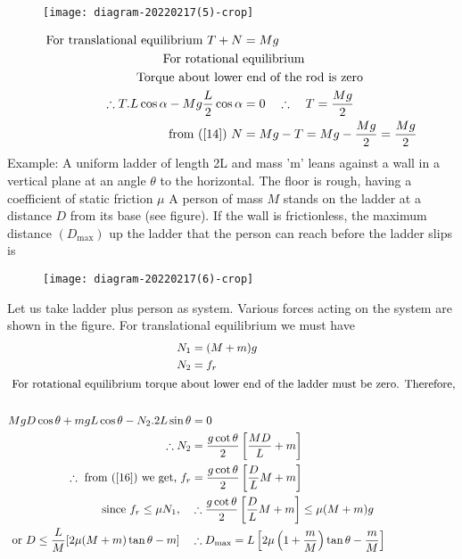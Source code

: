 \begin{enumerate}
\begin{figure}[H]
	\centering
	\texttt{[image: diagram-20220217(5)-crop]}
\end{figure}
\begin{align}
\text{For translational equilibrium }T+N&=M g \label{14}\\
\text{For rotational }&\text{equilibrium }\notag\\
\text{Torque about lower}&\text{ end of the rod is zero}\notag\\
	\therefore T . L \cos \alpha-M g \frac{L}{2} \cos \alpha&=0 \quad \therefore \quad T=\frac{M g}{2}\notag\\
	\text{from (\ref{14}) }N&=M g-T=M g-\frac{M g}{2}=\frac{M g}{2}\notag
\end{align}
Example: A uniform ladder of length 2L and mass 'm' leans against a wall in a vertical plane at an angle $\theta$ to the horizontal. The floor is rough, having a coefficient of static friction $\mu$
A person of mass $M$ stands on the ladder at a distance $D$ from its base (see figure). If the wall is frictionless, the maximum distance $\left(D_{\max }\right)$ up the ladder that the person can reach before the ladder slips is
\begin{figure}[H]
	\centering
	\texttt{[image: diagram-20220217(6)-crop]}
\end{figure}
\begin{answer}
	Let us take ladder plus person as system. Various forces acting on the system are shown in the figure. For translational equilibrium we must have
	\begin{align}
	N_{1}&=(M+m) g\label{15}\\
	N_{2}&=f_{r}\label{16}\\
	\intertext{	For rotational equilibrium torque about lower end of the ladder must be zero. Therefore,}\notag\\
	M g D \cos \theta+m g L \cos \theta-N_{2} .2 L \sin \theta&=0\notag\\
	\therefore N_{2}&=\frac{g \cot \theta}{2}\left[\frac{M D}{L}+m\right]\notag\\
	\therefore\text{ from (\ref{16}) we get, }f_{r}&=\frac{g \cot \theta}{2}\left[\frac{D}{L} M+m\right]\notag\\
	\text{since }f_{r} \leq \mu N_{1}, \quad &\therefore \frac{g \cot \theta}{2}\left[\frac{D}{L} M+m\right] \leq \mu(M+m) g\notag\\
\text{	or }D \leq \frac{L}{M}[2 \mu(M+m) \tan \theta-m] \quad &\therefore D_{\max }=L\left[2 \mu\left(1+\frac{m}{M}\right) \tan \theta-\frac{m}{M}\right]\notag

\end{align}
\end{answer}
\end{enumerate}
